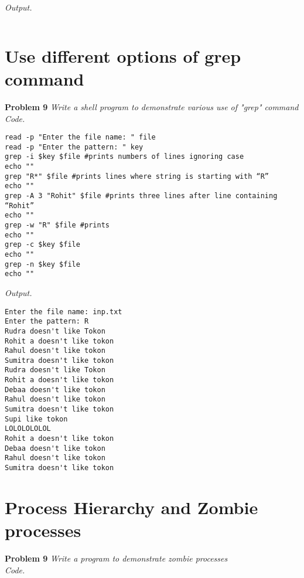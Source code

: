 \documentclass[12pt]{article}
\begin{document}
\textit{Output.}
\begin{lstlisting}

\end{lstlisting}

\section{Use different options of grep command}

\textbf{Problem 9} \textit{Write a shell program to demonstrate various use of "grep" command}\\

\textit{Code.}

\begin{lstlisting}
read -p "Enter the file name: " file
read -p "Enter the pattern: " key
grep -i $key $file #prints numbers of lines ignoring case
echo ""
grep "R*" $file #prints lines where string is starting with “R”
echo ""
grep -A 3 "Rohit" $file #prints three lines after line containing “Rohit”
echo ""
grep -w "R" $file #prints
echo ""
grep -c $key $file
echo ""
grep -n $key $file
echo ""
\end{lstlisting}

\textit{Output.}
\begin{lstlisting}
Enter the file name: inp.txt
Enter the pattern: R
Rudra doesn't like Tokon
Rohit a doesn't like tokon
Rahul doesn't like tokon
Sumitra doesn't like tokon
Rudra doesn't like Tokon
Rohit a doesn't like tokon
Debaa doesn't like tokon
Rahul doesn't like tokon
Sumitra doesn't like tokon
Supi like tokon
LOLOLOLOLOL
Rohit a doesn't like tokon
Debaa doesn't like tokon
Rahul doesn't like tokon
Sumitra doesn't like tokon
\end{lstlisting}

\section{Process Hierarchy and Zombie processes}

\textbf{Problem 9} \textit{Write a program to demonstrate zombie processes}\\

\textit{Code.}
\end{document}
